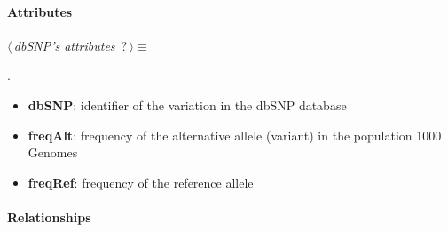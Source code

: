 \paragraph{Attributes}      

	\begin{flushleft} \small
\begin{minipage}{\linewidth}\label{scrap4}\raggedright\small
{} $\langle\,${\itshape {dbSNP's attributes}}\nobreak\ {\footnotesize {?}}$\,\rangle\equiv$
\vspace{-1ex}
\begin{list}{}{} \item

                
        {\NWsep}
\end{list}
\vspace{-1.5ex}
\footnotesize
\begin{list}{}{\setlength{\itemsep}{-\parsep}\setlength{\itemindent}{-\leftmargin}}
\item {\NWtxtMacroNoRef}.

\item{}
\end{list}
\end{minipage}\vspace{4ex}
\end{flushleft}
\begin{itemize}
 	\item \textbf{dbSNP}: identifier of the variation in the dbSNP database
 	\item \textbf{freqAlt}: frequency of the alternative allele (variant) in the population 1000 Genomes
 	\item \textbf{freqRef}: frequency of the reference allele
\end{itemize}

\paragraph{Relationships} 


